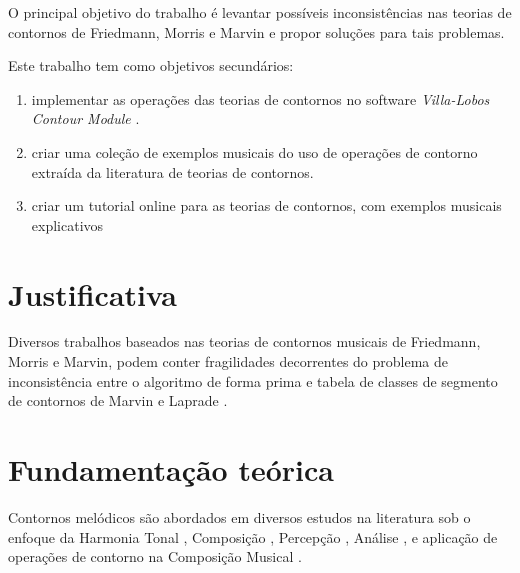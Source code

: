 \documentclass[12pt]{article}
\newcommand{\eng}[1]{\textit{#1}}
\begin{document}
O principal objetivo do trabalho é levantar possíveis inconsistências
nas teorias de contornos de Friedmann, Morris e Marvin e propor
soluções para tais problemas.

Este trabalho tem como objetivos secundários:

\begin{enumerate}
\item implementar as operações das teorias de contornos no software
  \eng{Villa-Lobos Contour Module} \cite{sampaio.ea10:villa-lobos}.
\item criar uma coleção de exemplos musicais do uso de operações de
  contorno extraída da literatura de teorias de contornos.
\item criar um tutorial online para as teorias de contornos, com
  exemplos musicais explicativos
\end{enumerate}

\section{Justificativa}
\label{sec:justificativa}

Diversos trabalhos baseados nas teorias de contornos musicais de
Friedmann, Morris e Marvin, podem conter fragilidades decorrentes do
problema de inconsistência entre o algoritmo de forma prima e tabela
de classes de segmento de contornos de Marvin e Laprade
\cite{marvin.ea87:relating}.

\section{Fundamentação teórica}
\label{sec:fund-teor}


Contornos melódicos são abordados em diversos estudos na literatura
sob o enfoque da Harmonia Tonal \cite{piston59:harmony}, Composição
\cite{schoenberg67:fundamentals,toch77:shaping}, Percepção
\cite{edworthy85:musical,dewitt.ea86:recognition}, Análise
\cite{adams76:melodic,friedmann85:methodology,friedmann87:response,marvin.ea87:relating,marvin88:generalized,marvin91:perception,marvin.ea95:generalization,morris87:composition,morris93:directions,morris95:compositional,clifford95:contour,beard03:contour,bor09:contour,schultz08:melodic,schultz09:diachronic},
e aplicação de operações de contorno na Composição Musical
\cite{sampaio08:em}.

\end{document}

